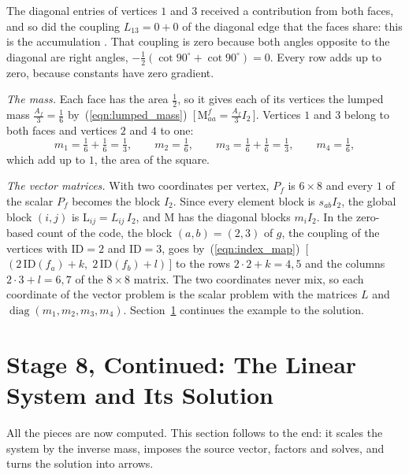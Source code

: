 \begin{example}
\begin{equation*}
\end{equation*}
The diagonal entries of vertices $1$ and $3$ received a contribution from both faces, and so did the coupling $L_{13} = 0 + 0$ of the diagonal edge that the faces share: this is the accumulation \code{+=}. That coupling is zero because both angles opposite to the diagonal are right angles, $-\frac12(\cot 90^\circ + \cot 90^\circ) = 0$. Every row adds up to zero, because constants have zero gradient.

\emph{The mass.} Each face has the area $\frac12$, so it gives each of its vertices the lumped mass $\frac{A_f}{3} = \frac16$ by~(\ref{eqn:lumped_mass})~[\,$\mathrm M^f_{aa} = \tfrac{A_f}{3}I_2$\,]. Vertices $1$ and $3$ belong to both faces and vertices $2$ and $4$ to one:
\begin{equation*}
m_1 = \tfrac16 + \tfrac16 = \tfrac13, \qquad m_2 = \tfrac16, \qquad m_3 = \tfrac16 + \tfrac16 = \tfrac13, \qquad m_4 = \tfrac16 ,
\end{equation*}
which add up to $1$, the area of the square.

\emph{The vector matrices.} With two coordinates per vertex, $P_f$ is $6\times 8$ and every $1$ of the scalar $P_f$ becomes the block $I_2$. Since every element block is $s_{ab}I_2$, the global block $(i, j)$ is $\mathrm L_{ij} = L_{ij}\, I_2$, and $\mathrm M$ has the diagonal blocks $m_i I_2$. In the zero-based count of the code, the block $(a, b) = (2, 3)$ of $g$, the coupling of the vertices with $\mathrm{ID} = 2$ and $\mathrm{ID} = 3$, goes by~(\ref{eqn:index_map})~[\,$(2\,\mathrm{ID}(f_a) + k,\; 2\,\mathrm{ID}(f_b) + l)$\,] to the rows $2\cdot 2 + k = 4, 5$ and the columns $2\cdot 3 + l = 6, 7$ of the $8\times 8$ matrix. The two coordinates never mix, so each coordinate of the vector problem is the scalar problem with the matrices $L$ and $\operatorname{diag}(m_1, m_2, m_3, m_4)$. Section~\ref{section:solve} continues the example to the solution.
\end{example}

\section{Stage 8, Continued: The Linear System and Its Solution}
\label{section:solve}

All the pieces are now computed. This section follows  to the end: it scales the system by the inverse mass, imposes the source vector, factors and solves, and turns the solution into arrows.

